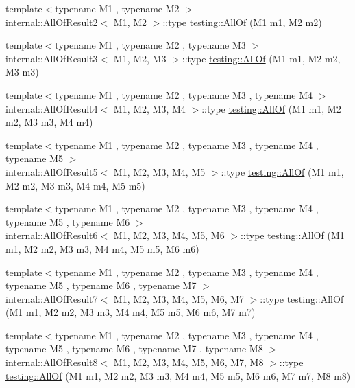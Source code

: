 \begin{DoxyCompactItemize}
\item 
{\footnotesize template$<$typename M1 , typename M2 $>$ }\\internal\+::\+All\+Of\+Result2$<$ M1, M2 $>$\+::type \mbox{\hyperlink{namespacetesting_af7618e8606c1cb45738163688944e2b7}{testing\+::\+All\+Of}} (M1 m1, M2 m2)
\item 
{\footnotesize template$<$typename M1 , typename M2 , typename M3 $>$ }\\internal\+::\+All\+Of\+Result3$<$ M1, M2, M3 $>$\+::type \mbox{\hyperlink{namespacetesting_a75934d8ea6b986d2157a5ebfe68f9904}{testing\+::\+All\+Of}} (M1 m1, M2 m2, M3 m3)
\item 
{\footnotesize template$<$typename M1 , typename M2 , typename M3 , typename M4 $>$ }\\internal\+::\+All\+Of\+Result4$<$ M1, M2, M3, M4 $>$\+::type \mbox{\hyperlink{namespacetesting_a4a9a119cde16e43b364f3573136857a1}{testing\+::\+All\+Of}} (M1 m1, M2 m2, M3 m3, M4 m4)
\item 
{\footnotesize template$<$typename M1 , typename M2 , typename M3 , typename M4 , typename M5 $>$ }\\internal\+::\+All\+Of\+Result5$<$ M1, M2, M3, M4, M5 $>$\+::type \mbox{\hyperlink{namespacetesting_ab8f5e6cf1c22acf51a2b9b376b0ef03a}{testing\+::\+All\+Of}} (M1 m1, M2 m2, M3 m3, M4 m4, M5 m5)
\item 
{\footnotesize template$<$typename M1 , typename M2 , typename M3 , typename M4 , typename M5 , typename M6 $>$ }\\internal\+::\+All\+Of\+Result6$<$ M1, M2, M3, M4, M5, M6 $>$\+::type \mbox{\hyperlink{namespacetesting_afc8e2d405f80e7d3df32842ddb648125}{testing\+::\+All\+Of}} (M1 m1, M2 m2, M3 m3, M4 m4, M5 m5, M6 m6)
\item 
{\footnotesize template$<$typename M1 , typename M2 , typename M3 , typename M4 , typename M5 , typename M6 , typename M7 $>$ }\\internal\+::\+All\+Of\+Result7$<$ M1, M2, M3, M4, M5, M6, M7 $>$\+::type \mbox{\hyperlink{namespacetesting_acbd4eef50126ff6db5b93ac5faa71b45}{testing\+::\+All\+Of}} (M1 m1, M2 m2, M3 m3, M4 m4, M5 m5, M6 m6, M7 m7)
\item 
{\footnotesize template$<$typename M1 , typename M2 , typename M3 , typename M4 , typename M5 , typename M6 , typename M7 , typename M8 $>$ }\\internal\+::\+All\+Of\+Result8$<$ M1, M2, M3, M4, M5, M6, M7, M8 $>$\+::type \mbox{\hyperlink{namespacetesting_a7ec0bc4eca9805e85b9b34bbbf3d3ae2}{testing\+::\+All\+Of}} (M1 m1, M2 m2, M3 m3, M4 m4, M5 m5, M6 m6, M7 m7, M8 m8)

\end{DoxyCompactItemize}
